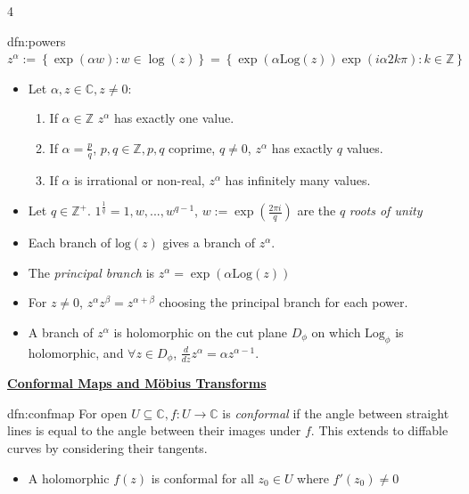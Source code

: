 \documentclass[landscape, 8pt]{extarticle}
\begin{document}
\begin{multicols*}{4}
		
		\begin{dfn}{dfn:powers}{ }
			$z^\alpha := \left\{\exp(\alpha w) : w \in \log(z)\right\} = \left\{\exp(\alpha\text{Log}(z)) \exp(i \alpha 2 k \pi): k \in \mathbb{Z}\right\}$
			\begin{itemize}
				\item Let $\alpha, z \in \mathbb{C}, z \ne 0$:
					\begin{enumerate}[label = (\roman*)]
						\item If $\alpha \in \mathbb{Z}$ $z^\alpha$ has exactly one value.
						\item If $\alpha = \frac{p}{q}$, $p, q \in \mathbb{Z}, p, q$ coprime, $q \ne 0$, $z^\alpha$ has exactly $q$ values.
						\item If $\alpha$ is irrational or non-real, $z^\alpha$ has infinitely many values.
					\end{enumerate}
				\item Let $q \in \mathbb{Z}^+$. $1^{\frac{1}{q}} = 1, w, ..., w^{q-1}$, $w := \exp(\frac{2 \pi i}{q})$ are the $q$ \textit{roots of unity}
				\item Each branch of $\text{log}(z)$ gives a branch of $z^\alpha$.
				\item The \textit{principal branch} is $z^\alpha = \exp(\alpha \text{Log}(z))$
				\item For $z \ne 0$, $z^\alpha z^\beta = z^{\alpha + \beta}$ choosing the principal branch for each power.
				\item A branch of $z^\alpha$ is holomorphic on the cut plane $D_\phi$ on which $\text{Log}_\phi$ is holomorphic, and $ \forall z \in D_\phi$, $\frac{d}{dz}z^\alpha = \alpha z^{\alpha -1}$.
			\end{itemize}
			
			
		\end{dfn}
	
	
	
	{\footnotesize \textbf{\underline{Conformal Maps and M{\"o}bius Transforms}}}
	
	\begin{dfn}{dfn:confmap}{ }	
		For open $U \subseteq \mathbb{C}, f: U \to \mathbb{C}$ is \textit{conformal} if the angle between straight lines is equal to the angle between their images under $f$. This extends to diffable curves by considering their tangents.
		\begin{itemize}
			\item A holomorphic $f(z)$ is conformal for all $z_0 \in U$ where $f'(z_0) \ne 0$
		\end{itemize}
		

\end{dfn}
\end{multicols*}
\end{document}
